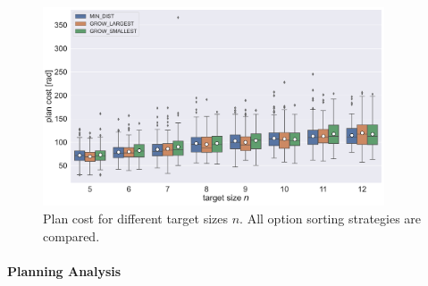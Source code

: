 \begin{figure}
	\centering
	\includegraphics[width=0.9\textwidth]{figures/plots/AFN_cost.pdf}
	\caption[Plan cost for different target sizes]{Plan cost for different target sizes $n$. All option sorting strategies are compared.}
	\label{fig:AFN_cost}
\end{figure}



\paragraph{Planning Analysis}

